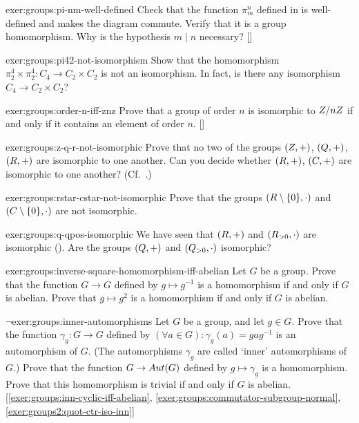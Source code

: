 \begin{exer}{\exerused}{exer:groups:pi-nm-well-defined}
  Check that the function $\pi^n_m$ defined in
   is well-defined and makes the
  diagram commute. Verify that it is a group homomorphism. Why is the
  hypothesis $m \mid n$ necessary? []
\end{exer}
\begin{exer}{}{exer:groups:pi42-not-isomorphism}
  Show that the homomorphism
  $\pi^4_2 \times \pi^4_2 : C_4 \to C_2 \times C_2$ is not an
  isomorphism. In fact, is there any isomorphism
  $C_4 \to C_2 \times C_2$?
\end{exer}
\begin{exer}{\exerused}{exer:groups:order-n-iff-znz}
  Prove that a group of order $n$ is isomorphic to $Z/nZ$ if and
  only if it contains an element of order
  $n$. []
\end{exer}
\begin{exer}{}{exer:groups:z-q-r-not-isomorphic}
  Prove that no two of the groups $(Z, +)$, $(Q, +)$, $(R, +)$ are
  isomorphic to one another. Can you decide whether $(R, +)$,
  $(C, +)$ are isomorphic to one another? (Cf.\
  .)
\end{exer}
\begin{exer}{}{exer:groups:rstar-cstar-not-isomorphic}
  Prove that the groups $(R \mathbin{\backslash} \{0\}, \cdot)$ and
  $(C \mathbin{\backslash} \{0\}, \cdot)$ are not isomorphic.
\end{exer}
\begin{exer}{}{exer:groups:q-qpos-isomorphic}
  We have seen that $(R, +)$ and $(R_{>0}, \cdot)$ are isomorphic
  (\Cref{exam:groups:isomorphism-examples}). Are the groups $(Q, +)$
  and $(Q_{>0}, \cdot)$ isomorphic?
\end{exer}
\begin{exer}{}{exer:groups:inverse-square-homomorphism-iff-abelian}
  Let $G$ be a group. Prove that the function $G \to G$ defined by
  $g \mapsto g^{-1}$ is a homomorphism if and only if $G$ is
  abelian. Prove that $g \mapsto g^2$ is a homomorphism if and only if
  $G$ is abelian.
\end{exer}
\begin{exer}{$\lnot$}{exer:groups:inner-automorphisms}
  Let $G$ be a group, and let $g \in G$. Prove that the function
  $\gamma_g : G \to G$ defined by
  $(\forall a \in G) : \gamma_g(a) = gag^{-1}$ is an automorphism of
  $G$. (The automorphisms $\gamma_g$ are called `inner' automorphisms
  of $G$.) Prove that the function $G \to Aut(G)$ defined by
  $g \mapsto \gamma_g$ is a homomorphism. Prove that this homomorphism
  is trivial if and only if $G$ is
  abelian. [\ref{exer:groups:inn-cyclic-iff-abelian},
  \ref{exer:groups:commutator-subgroup-normal},
  \ref{exer:groups2:quot-ctr-iso-inn}]
\end{exer}

